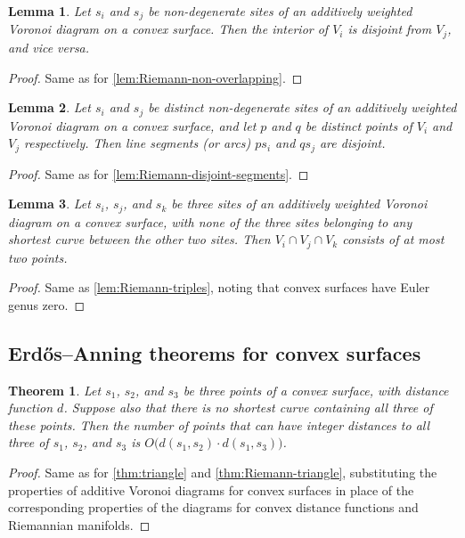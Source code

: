\documentclass[11pt]{article}
\newtheorem{theorem}{Theorem}
\newtheorem{lemma}{Lemma}
\theoremstyle{definition}
\begin{document}
\begin{lemma}
Let $s_i$ and $s_j$ be non-degenerate sites of an additively weighted Voronoi diagram on a convex surface. Then the interior of $V_i$ is disjoint from $V_j$, and vice versa.
\end{lemma}

\begin{proof}
Same as for \cref{lem:Riemann-non-overlapping}.
\end{proof}

\begin{lemma}
Let $s_i$ and $s_j$ be distinct non-degenerate sites of an additively weighted Voronoi diagram on a convex surface, and let $p$ and $q$ be distinct points of $V_i$ and $V_j$ respectively. Then line segments (or arcs)  $ps_i$ and $qs_j$ are disjoint.
\end{lemma}

\begin{proof}
Same as for \cref{lem:Riemann-disjoint-segments}.
\end{proof}

\begin{lemma}
Let $s_i$, $s_j$, and $s_k$ be three sites of an additively weighted Voronoi diagram on a convex surface, with none of the three sites belonging to any shortest curve between the other two sites. Then $V_i\cap V_j\cap V_k$ consists of at most two points.
\end{lemma}

\begin{proof}
Same as \cref{lem:Riemann-triples}, noting that convex surfaces have Euler genus zero.
\end{proof}
\fi

\subsection{Erd\H{o}s--Anning theorems for convex surfaces}

\begin{theorem}
\label{thm:convex-triangle}
Let $s_1$, $s_2$, and $s_3$ be three points of a convex surface, with distance function $d$. Suppose also that there is no shortest curve containing all three of these points. Then the number of points that can have integer distances to all three of $s_1$, $s_2$, and $s_3$ is $O\bigl(d(s_1,s_2)\cdot d(s_1,s_3)\bigr)$.
\end{theorem}

\begin{proof}
Same as for \cref{thm:triangle} and \cref{thm:Riemann-triangle}, substituting the properties of additive Voronoi diagrams for convex surfaces in place of the corresponding properties of the diagrams for convex distance functions and Riemannian manifolds.
\end{proof}
\end{document}
